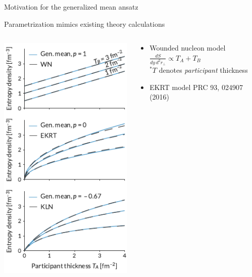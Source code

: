 \documentclass{beamer}
\begin{document}
\begin{frame}{Motivation for the generalized mean ansatz}
\end{frame}


\begin{frame}[t]{Parametrization mimics existing theory calculations}
    \medskip
    \begin{columns}[T]
        \begin{column}{0.3\textwidth}
            \includegraphics[height=0.8\textheight]{cgc_compare}
        \end{column}
        \begin{column}{0.6\textwidth}
            \begin{itemize}
                \itemsep2ex \small
                \item Wounded nucleon model \\[1em]
                      $\displaystyle \frac{dS}{dy\,d^2r_\perp} 
                      \propto T_A + T_B$ \\[1em]
                      {\scriptsize $^*T$ denotes \emph{participant} thickness} 
                \item EKRT model \; {\scriptsize \color{theme} 
                      PRC 93, 024907 (2016)} \\

\end{itemize}
\end{column}
\end{columns}
\end{frame}
\end{document}
